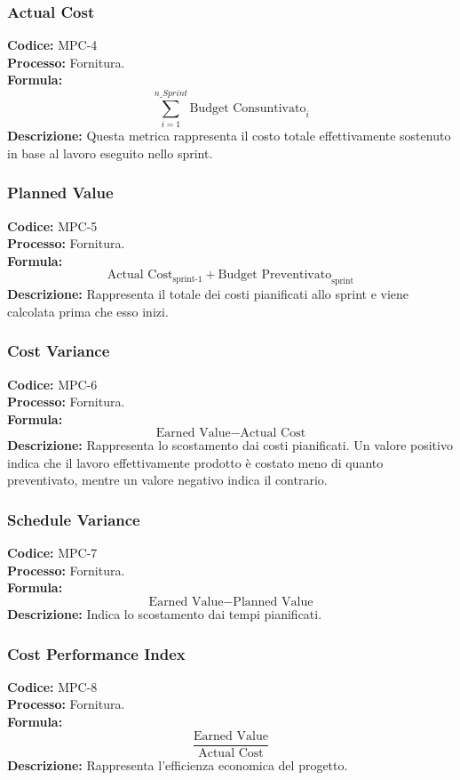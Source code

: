 \subsubsection{Actual Cost}
\textbf{Codice:} MPC-4 \\
\textbf{Processo:} Fornitura. \\
\textbf{Formula:}
\[
\sum_{i=1}^{n\_Sprint} \text{Budget Consuntivato}_i
\]
\textbf{Descrizione:} Questa metrica rappresenta il costo totale effettivamente sostenuto in base al lavoro eseguito nello sprint.

\subsubsection{Planned Value}
\textbf{Codice:} MPC-5 \\
\textbf{Processo:} Fornitura. \\
\textbf{Formula:}
\[
\text{Actual Cost}_{\text{sprint-1}} + \text{Budget Preventivato}_{\text{sprint}}
\]
\textbf{Descrizione:} Rappresenta il totale dei costi pianificati allo sprint e viene calcolata prima che esso inizi.

\subsubsection{Cost Variance}
\textbf{Codice:} MPC-6 \\
\textbf{Processo:} Fornitura. \\
\textbf{Formula:}
\[
\text{Earned Value} - \text{Actual Cost}
\]
\textbf{Descrizione:} Rappresenta lo scostamento dai costi pianificati. Un valore positivo indica che il lavoro effettivamente prodotto è costato meno di quanto preventivato, mentre un valore negativo indica il contrario.

\subsubsection{Schedule Variance}
\textbf{Codice:} MPC-7 \\
\textbf{Processo:} Fornitura. \\
\textbf{Formula:}
\[
\text{Earned Value} - \text{Planned Value}
\]
\textbf{Descrizione:} Indica lo scostamento dai tempi pianificati.

\subsubsection{Cost Performance Index}
\textbf{Codice:} MPC-8 \\
\textbf{Processo:} Fornitura. \\
\textbf{Formula:}
\[
\frac{\text{Earned Value}}{\text{Actual Cost}}
\]
\textbf{Descrizione:} Rappresenta l’efficienza economica del progetto.

